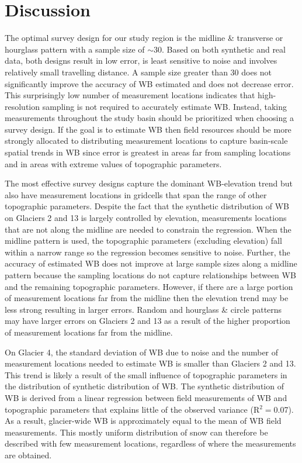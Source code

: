 \documentclass{article}
\begin{document}
\section{Discussion}

The optimal survey design for our study region is the midline \& transverse or  hourglass pattern with a sample size of $\sim30$. Based on both synthetic and real data, both designs result in low error, is least sensitive to noise and involves relatively small travelling distance. A sample size greater than 30 does not significantly improve the accuracy of WB estimated and does not decrease error. This surprisingly low number of measurement locations indicates that high-resolution sampling is not required to accurately estimate WB. Instead, taking measurements throughout the study basin should be prioritized when choosing a survey design. If the goal is to estimate WB then field resources should be more strongly allocated to distributing measurement locations to capture basin-scale spatial trends in WB since error is greatest in areas far from sampling locations and in areas with extreme values of topographic parameters. 

The most effective survey designs capture the dominant WB-elevation trend but also have measurement locations in gridcells that span the range of other topographic parameters. Despite the fact that the synthetic distribution of WB on Glaciers 2 and 13 is largely controlled by elevation, measurements locations that are not along the midline are needed to constrain the regression. When the midline pattern is used, the topographic parameters (excluding elevation) fall within a narrow range so the regression becomes sensitive to noise. Further, the accuracy of estimated WB does not improve at large sample sizes along a midline pattern because the sampling locations do not capture relationships between WB and the remaining topographic parameters. However, if there are a large portion of measurement locations far from the midline then the elevation trend may be less strong resulting in larger errors. Random and hourglass \& circle patterns may have larger errors on Glaciers 2 and 13 as a result of the higher proportion of measurement locations far from the midline. 

On Glacier 4, the standard deviation of WB due to noise and the number of measurement locations needed to estimate WB is smaller than Glaciers 2 and 13. This trend is likely a result of the small influence of topographic parameters in the distribution of synthetic distribution of WB. The synthetic distribution of WB is derived from a linear regression between field measurements of WB and topographic parameters that explains little of the observed variance (R$^2=$0.07). As a result, glacier-wide WB is approximately equal to the mean of WB field measurements. This mostly uniform distribution of snow can therefore be described with few measurement locations, regardless of where the measurements are obtained. 
\end{document}
